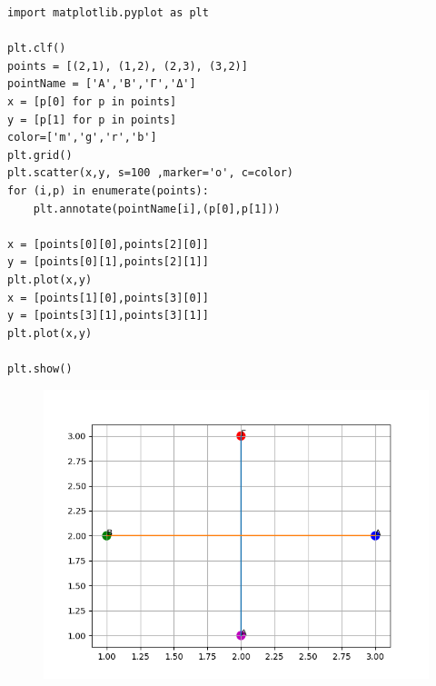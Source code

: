 \begin{lstlisting}
import matplotlib.pyplot as plt

plt.clf()
points = [(2,1), (1,2), (2,3), (3,2)]
pointName = ['Α','Β','Γ','Δ']
x = [p[0] for p in points]
y = [p[1] for p in points]
color=['m','g','r','b']
plt.grid()
plt.scatter(x,y, s=100 ,marker='o', c=color)
for (i,p) in enumerate(points):
    plt.annotate(pointName[i],(p[0],p[1]))

x = [points[0][0],points[2][0]]
y = [points[0][1],points[2][1]]
plt.plot(x,y)
x = [points[1][0],points[3][0]]
y = [points[3][1],points[3][1]]
plt.plot(x,y)

plt.show()
\end{lstlisting}
\begin{figure}
\includegraphics{graph2.png}
\end{figure}

